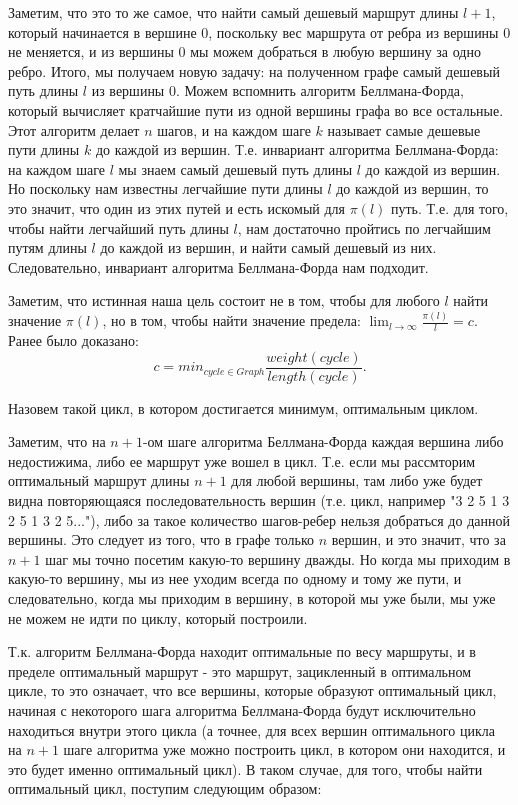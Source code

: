 \documentclass[a4paper,12pt]{article}
\begin{document}
Заметим, что это то же самое, что найти самый дешевый маршрут длины $l+1$, который начинается в вершине 0, поскольку вес маршрута от ребра из вершины 0 не меняется, и из вершины 0 мы можем добраться в любую вершину за одно ребро. Итого, мы получаем новую задачу: на полученном графе самый дешевый путь длины $l$ из вершины 0. Можем вспомнить алгоритм Беллмана-Форда, который вычисляет кратчайшие пути из одной вершины графа во все остальные. Этот алгоритм делает $n$ шагов, и на каждом шаге $k$ называет самые дешевые пути длины $k$ до каждой из вершин. Т.е. инвариант алгоритма Беллмана-Форда: на каждом шаге $l$ мы знаем самый дешевый путь длины $l$ до каждой из вершин. Но поскольку нам известны легчайшие пути длины $l$ до каждой из вершин, то это значит, что один из этих путей и есть искомый для $\pi(l)$ путь. Т.е. для того, чтобы найти легчайший путь длины $l$, нам достаточно пройтись по легчайшим путям длины $l$ до каждой из вершин, и найти самый дешевый из них. Следовательно, инвариант алгоритма Беллмана-Форда нам подходит.

Заметим, что истинная наша цель состоит не в том, чтобы для любого $l$ найти значение $\pi(l)$, но в том, чтобы найти значение предела: $\lim _{l \rightarrow \infty} \frac{\pi(l)}{l} = c$. Ранее было доказано: $$c = min_{cycle \in Graph} \frac{weight(cycle)}{length(cycle)}.$$  

Назовем такой цикл, в котором достигается минимум, оптимальным циклом.

Заметим, что на $n+1$-ом шаге алгоритма Беллмана-Форда каждая вершина либо недостижима, либо ее маршрут уже вошел в цикл. Т.е. если мы рассмторим оптимальный маршрут длины $n+1$ для любой вершины, там либо уже будет видна повторяющаяся последовательность вершин (т.е. цикл, например "3 2 5 1 3 2 5 1 3 2 5..."), либо за такое количество шагов-ребер нельзя добраться до данной вершины. Это следует из того, что в графе только $n$ вершин, и это значит, что за $n+1$ шаг мы точно посетим какую-то вершину дважды. Но когда мы приходим в какую-то вершину, мы из нее уходим всегда по одному и тому же пути, и следовательно, когда мы приходим в вершину, в которой мы уже были, мы уже не можем не идти по циклу, который построили.

Т.к. алгоритм Беллмана-Форда находит оптимальные по весу маршруты, и в пределе оптимальный маршрут - это маршрут, зацикленный в оптимальном цикле, то это означает, что все вершины, которые образуют оптимальный цикл, начиная с некоторого шага алгоритма Беллмана-Форда будут исключительно находиться внутри этого цикла (а точнее, для всех вершин оптимального цикла на $n+1$ шаге алгоритма уже можно построить цикл, в котором они находится, и это будет именно оптимальный цикл). В таком случае, для того, чтобы найти оптимальный цикл, поступим следующим образом:
\end{document}
